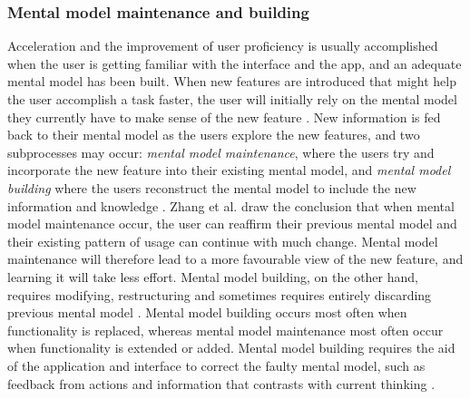 \subsubsection{Mental model maintenance and building}
Acceleration and the improvement of user proficiency is usually accomplished when the user is getting familiar with the interface and the app, and an adequate mental model has been built. When new features are introduced that might help the user accomplish a task faster, the user will initially rely on the mental model they currently have to make sense of the new feature \cite{Orlikowski2000}. New information is fed back to their mental model as the users explore the new features, and two subprocesses may occur: \textit{mental model maintenance}, where the users try and incorporate the new feature into their existing mental model, and \textit{mental model building} where the users reconstruct the mental model to include the new information and knowledge \cite{Vandenbosch1996}. Zhang et al. \cite{Zhang2011} draw the conclusion that when mental model maintenance occur, the user can reaffirm their previous mental model and their existing pattern of usage can continue with much change. Mental model maintenance will therefore lead to a more favourable view of the new feature, and learning it will take less effort. Mental model building, on the other hand, requires modifying, restructuring and sometimes requires entirely discarding previous mental model \cite{Vandenbosch1996}. Mental model building occurs most often when functionality is replaced, whereas mental model maintenance most often occur when functionality is extended or added. Mental model building requires the aid of the application and interface to correct the faulty mental model, such as feedback from actions and information that contrasts with current thinking \cite{Hsu2011}.

